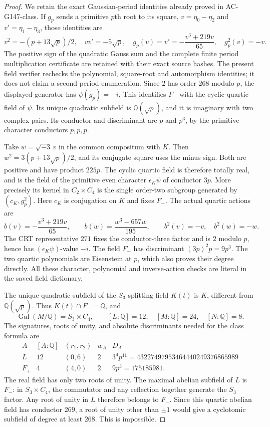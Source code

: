 \begin{proof}
We retain the exact Gaussian-period identities already proved in
AC-G147-class.  If $g_p$ sends a primitive $p$th root to its square,
$v=\eta_0-\eta_2$ and $v'=\eta_1-\eta_3$, those identities are
\[
 v^2=-(p+13\sqrt p)/2,\quad
 vv'=-5\sqrt p,\quad
 g_p(v)=v'=-\frac{v^3+219v}{65},\quad g_p^2(v)=-v.
 \tag{PCQ.4}
\]
The positive sign of the quadratic Gauss sum and the complete
finite period multiplication certificate are retained with their
exact source hashes.  The present field verifier rechecks the
polynomial, square-root and automorphism identities; it does not
claim a second period enumeration.
Since $2$ has order $268$ modulo $p$, the displayed generator has
$\psi(g_p)=-i$.  This identifies $F_-$ with the cyclic quartic
field of $\psi$.
Its unique quadratic subfield is $\mathbb Q(\sqrt p)$, and it is
imaginary with two complex pairs.  Its conductor and discriminant are
$p$ and $p^3$, by the primitive character conductors $p,p,p$.

Take $w=\sqrt{-3}\,v$ in the common compositum with $K$.
Then $w^2=3(p+13\sqrt p)/2$, and its conjugate square uses the
minus sign.  Both are positive and have product $225p$.
The cyclic quartic field is therefore totally real, and is the
field of the primitive even character $\epsilon_K\psi$ of conductor
$3p$.  More precisely its kernel in $C_2\times C_4$ is the single
order-two subgroup generated by $(c_K,g_p^2)$.
Here $c_K$ is conjugation on $K$ and fixes $F_-$.
The actual quartic actions are
\[
 b(v)=-\frac{v^3+219v}{65},\qquad
 b(w)=\frac{w^3-657w}{195},\qquad b^2(v)=-v,
 \quad b^2(w)=-w.
 \tag{PCQ.5}
\]
The CRT representative $271$ fixes the conductor-three factor
and is $2$ modulo $p$, hence has $(\epsilon_K\psi)$-value $-i$.
The field $F_+$ has discriminant $(3p)^2p=9p^3$.
The two quartic polynomials are Eisenstein at $p$, which also
proves their degree directly.  All these character, polynomial
and inverse-action checks are literal in the saved field dictionary.

The unique quadratic subfield of the $S_3$ splitting field $K(t)$
is $K$, different from $\mathbb Q(\sqrt p)$.
Thus $K(t)\cap F_-=\mathbb Q$, and
\[
 \operatorname{Gal}(M/\mathbb Q)=S_3\times C_4,\qquad
 [L:\mathbb Q]=12,\quad [M:\mathbb Q]=24,\quad[N:\mathbb Q]=8.
 \tag{PCQ.6}
\]
The signatures, roots of unity, and absolute discriminants needed
for the class formula are
\[
 \begin{array}{c|c|c|c|c}
 A&[A:\mathbb Q]&(r_1,r_2)&w_A&D_A\\ \hline
 L&12&(0,6)&2&3^4p^{11}=43227497953464440249376865989\\
 F_+&4&(4,0)&2&9p^3=175185981.
 \end{array}
 \tag{PCQ.7}
\]
The real field has only two roots of unity.  The maximal abelian
subfield of $L$ is $F_-$: in $S_3\times C_4$, the commutator and
any reflection together generate the $S_3$ factor.  Any root of
unity in $L$ therefore belongs to $F_-$.  Since this quartic
abelian field has conductor $269$, a root of unity other than
$\pm1$ would give a cyclotomic subfield of degree at least $268$.
This is impossible.


\end{proof}
